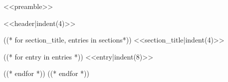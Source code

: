 <<preamble>>


    <<header|indent(4)>>

((* for section_title, entries in sections*))
    <<section_title|indent(4)>>

    ((* for entry in entries *))
        <<entry|indent(8)>>

    ((* endfor *))
((* endfor *))


